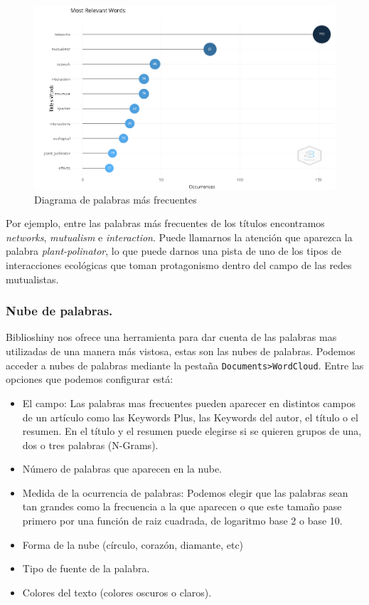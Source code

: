 \documentclass[
]{article}
\begin{document}
\begin{figure}
\centering
\includegraphics{MostFrequentWords.png}
\caption{Diagrama de palabras más frecuentes}
\end{figure}

Por ejemplo, entre las palabras más frecuentes de los títulos
encontramos \emph{networks}, \emph{mutualism} e \emph{interaction}.
Puede llamarnos la atención que aparezca la palabra
\emph{plant-polinator}, lo que puede darnos una pista de uno de los
tipos de interacciones ecológicas que toman protagonismo dentro del
campo de las redes mutualistas.

\hypertarget{nube-de-palabras.}{%
\subsubsection{Nube de palabras.}\label{nube-de-palabras.}}

Biblioshiny nos ofrece una herramienta para dar cuenta de las palabras
mas utilizadas de una manera más vistosa, estas son las nubes de
palabras. Podemos acceder a nubes de palabras mediante la pestaña
\texttt{Documents\textgreater{}WordCloud}. Entre las opciones que
podemos configurar está:

\begin{itemize}
\item
  El campo: Las palabras mas frecuentes pueden aparecer en distintos
  campos de un artículo como las Keywords Plus, las Keywords del autor,
  el título o el resumen. En el título y el resumen puede elegirse si se
  quieren grupos de una, dos o tres palabras (N-Grams).
\item
  Número de palabras que aparecen en la nube.
\item
  Medida de la ocurrencia de palabras: Podemos elegir que las palabras
  sean tan grandes como la frecuencia a la que aparecen o que este
  tamaño pase primero por una función de raiz cuadrada, de logaritmo
  base 2 o base 10.
\item
  Forma de la nube (círculo, corazón, diamante, etc)
\item
  Tipo de fuente de la palabra.
\item
  Colores del texto (colores oscuros o claros).
\end{itemize}
\end{document}

